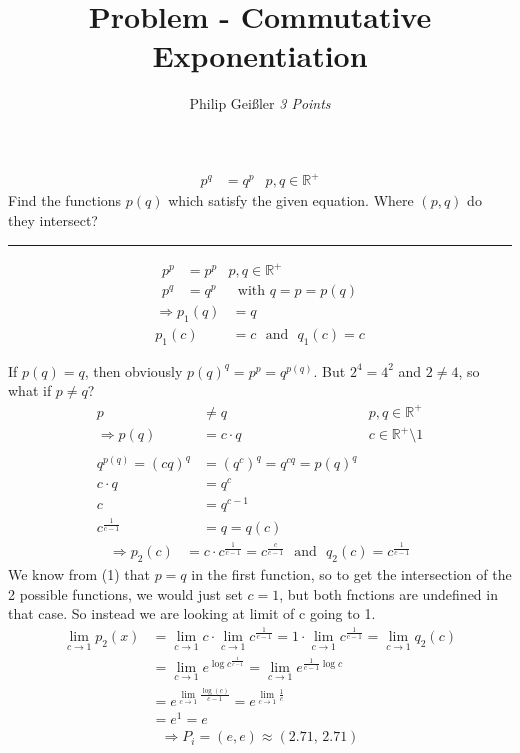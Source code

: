 \documentclass[12pt, a4paper]{article}
\newcommand{\rom}[1]{\uppercase\expandafter{\romannumeral #1\relax}}
\begin{document}
\title{Problem \rom{1} - Commutative Exponentiation}
\author{Philip Gei\ss{}ler \hspace{5cm} \textit{3 Points}}
\date{}
\maketitle
\vspace*{-.9cm}

\begin{align*}
p^q &= q^p & p,q\in\mathbb{R}^+
\end{align*}
Find the functions $p(q)$ which satisfy the given equation. Where $(p,q)$ do they intersect?
\hrule
\vspace*{9mm}

\begin{align*}
p^p &= p^p & p,q\in\mathbb{R}^+\\
p^q &= q^p &\text{~~with~} q = p = p(q)
\end{align*}
\vspace*{-1cm}
\begin{align}
\Rightarrow p_1(q) &= q\\
p_1(c) &= c \text{~~and~~} q_1(c) = c
\end{align}

If $p(q)=q$, then obviously $p(q)^q = p^p = q^{p(q)}$.
But $2^4 = 4^2$ and $2 \neq 4$, so what if $p \neq q$?
\begin{align*}
p &\neq q & p,q\in\mathbb{R}^+\\
\Rightarrow p(q) &= c\cdot q & c\in \mathbb{R}^+\setminus{1}\\~\\
q^{p(q)} = (cq)^q &= \left(q^c\right)^q= q^{cq} = p(q)^q\\
c\cdot q &= q^c\\
c &= q^{c-1}\\
c^\frac{1}{c-1} &= q = q(c)
\end{align*}
\vspace*{-1cm}
\begin{align}
\Rightarrow p_2(c) &= c\cdot c^\frac{1}{c-1} = c^\frac{c}{c-1}\text{~~and~~} q_2(c) = c^\frac{1}{c-1}
\end{align} 
We know from (1) that $p=q$ in the first function, so to get the intersection of the 2 possible functions, we would just set $c=1$, but both fnctions are undefined in that case. So instead we are looking at limit of c going to 1. 
\begin{align*}
\lim_{c\rightarrow 1} p_2(x) &= \lim_{c\rightarrow 1} c\cdot \lim_{c\rightarrow 1} c^\frac{1}{c-1} = 1 \cdot \lim_{c\rightarrow 1} c^\frac{1}{c-1} = \lim_{c\rightarrow 1} q_2(c)\\
& = \lim_{c\rightarrow 1} e^{\log{c^\frac{1}{c-1}}} = \lim_{c\rightarrow 1} e^{\frac{1}{c-1}\log{c}}\\
 &= e^{\lim\limits_{c\rightarrow 1} \frac{\log(c)}{c-1}} = e^{\lim\limits_{c\rightarrow 1} \frac{1}{c}}\\
 &= e^1 = e
\end{align*}
\begin{align}
\Rightarrow P_i = (e,e) \approx (2.71,\,2.71)
\end{align}
\end{document}

